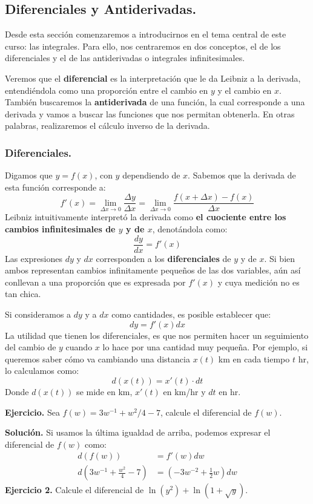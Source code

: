 \documentclass[12pt]{article}
\begin{document}
\subsection{Diferenciales y Antiderivadas.}

Desde esta sección comenzaremos a introducirnos en el tema central de este curso: las integrales. Para ello, nos centraremos en dos conceptos, el de los diferenciales y el de las antiderivadas o integrales infinitesimales.

Veremos que el \textbf{diferencial} es la interpretación que le da Leibniz a la derivada, entendiéndola como una proporción entre el cambio en $y$ y el cambio en $x$. También buscaremos la \textbf{antiderivada} de una función, la cual corresponde a una derivada y vamos a buscar las funciones que nos permitan obtenerla. En otras palabras, realizaremos el cálculo inverso de la derivada.


\subsubsection{Diferenciales.}

Digamos que $y = f(x)$, con $y$ dependiendo de $x$. Sabemos que la derivada de esta función corresponde a:
\[
  f'(x) = \lim_{\Delta x \to 0} \frac{\Delta y}{\Delta x}
        = \lim_{\Delta x \to 0} \frac{f(x + \Delta x) - f(x)}{\Delta x}
\]
Leibniz intuitivamente interpretó la derivada como \textbf{el cuociente entre los cambios infinitesimales de $y$ y de $x$}, denotándola como:
\[
  \frac{dy}{dx} = f'(x)
\]
Las expresiones $dy$ y $dx$ corresponden a los \textbf{diferenciales} de $y$ y de $x$. Si bien ambos representan cambios infinitamente pequeños de las dos variables, aún así conllevan a una proporción que es expresada por $f'(x)$ y cuya medición no es tan chica.

Si consideramos a $dy$ y a $dx$ como cantidades, es posible establecer que:
\[
  dy = f'(x)dx
\]
La utilidad que tienen los diferenciales, es que nos permiten hacer un seguimiento del cambio de $y$ cuando $x$ lo hace por una cantidad muy pequeña. Por ejemplo, si queremos saber cómo va cambiando una distancia $x(t)$ km en cada tiempo $t$ hr, lo calculamos como:
\[
  d(x(t)) = x'(t) \cdot dt
\]
Donde $d(x(t))$ se mide en km, $x'(t)$ en km/hr y $dt$ en hr.

\textbf{Ejercicio.} \quad Sea $f(w) = 3w^{-1} + w^{2}/4 - 7$, calcule el diferencial de $f(w)$.

\textbf{Solución.} \quad Si usamos la última igualdad de arriba, podemos expresar el diferencial de $f(w)$ como:
\begin{align*}
  d(f(w)) &= f'(w) dw \\
  d\left(3w^{-1} + \frac{w^{2}}{4} - 7\right) &= \left(-3w^{-2} + \frac{1}{2}w\right) dw
\end{align*}
\textbf{Ejercicio 2.} \quad Calcule el diferencial de $\ln(y^{2}) + \ln(1 + \sqrt{y})$.
\end{document}
